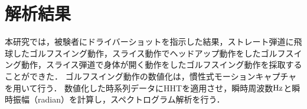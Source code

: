 \chapter{解析結果}
本研究では，被験者にドライバーショットを指示した結果，ストレート弾道に飛球したゴルフスイング動作，スライス動作でヘッドアップ動作をしたゴルフスイング動作，スライス弾道で身体が開く動作をしたゴルフスイング動作を採取することができた．
ゴルフスイング動作の数値化は，慣性式モーションキャプチャを用いて行う．
数値化した時系列データにHHTを適用させ，瞬時周波数$\rm{Hz}$と瞬時振幅（radian）を計算し，スペクトログラム解析を行う．

